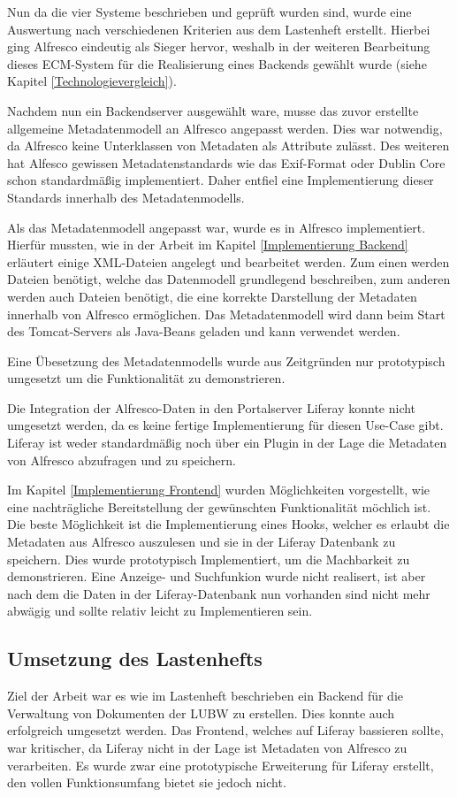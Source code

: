 Nun da die vier Systeme beschrieben und gepr\"uft wurden sind, wurde eine Auswertung nach verschiedenen Kriterien aus dem Lastenheft erstellt. Hierbei ging Alfresco eindeutig als Sieger hervor, weshalb in der weiteren Bearbeitung dieses ECM-System f\"ur die Realisierung eines Backends gew\"ahlt wurde (siehe Kapitel \ref{Technologievergleich}).

Nachdem nun ein Backendserver ausgew\"ahlt ware, musse das zuvor erstellte allgemeine Metadatenmodell an Alfresco angepasst werden. Dies war notwendig, da Alfresco keine Unterklassen von Metadaten als Attribute zul\"asst. Des weiteren hat Alfesco gewissen Metadatenstandards wie das \ac{Exif}-Format oder Dublin Core schon standardm\"a\ss{}ig implementiert. Daher entfiel eine Implementierung dieser Standards innerhalb des Metadatenmodells.

Als das Metadatenmodell angepasst war, wurde es in Alfresco implementiert. Hierf\"ur mussten, wie in der Arbeit im Kapitel \ref{Implementierung Backend} erl\"autert einige XML-Dateien angelegt und bearbeitet werden. Zum einen werden Dateien ben\"otigt, welche das Datenmodell grundlegend beschreiben, zum anderen werden auch Dateien ben\"otigt, die eine korrekte Darstellung der Metadaten innerhalb von Alfresco erm\"oglichen. 
Das Metadatenmodell wird dann beim Start des Tomcat-Servers als Java-Beans geladen und kann verwendet werden.

Eine \"Ubesetzung des Metadatenmodells wurde aus Zeitgr\"unden nur prototypisch umgesetzt um die Funktionalit\"at zu demonstrieren. 

Die Integration der Alfresco-Daten in den Portalserver Liferay konnte nicht umgesetzt werden, da es keine fertige Implementierung f\"ur diesen Use-Case gibt. Liferay ist weder standardm\"a\ss{}ig noch \"uber ein Plugin in der Lage die Metadaten von Alfresco abzufragen und zu speichern.

Im Kapitel \ref{Implementierung Frontend} wurden M\"oglichkeiten vorgestellt, wie eine nachtr\"agliche Bereitstellung der gew\"unschten Funktionalit\"at m\"ochlich ist. Die beste M\"oglichkeit ist die Implementierung eines Hooks, welcher es erlaubt die Metadaten aus Alfresco auszulesen und sie in der Liferay Datenbank zu speichern. Dies wurde prototypisch Implementiert, um die Machbarkeit zu demonstrieren. Eine Anzeige- und Suchfunkion wurde nicht realisert, ist aber nach dem die Daten in der Liferay-Datenbank nun vorhanden sind nicht mehr abw\"agig und sollte relativ leicht zu Implementieren sein.

\subsection{Umsetzung des Lastenhefts}
Ziel der Arbeit war es wie im Lastenheft beschrieben ein Backend f\"ur die Verwaltung von Dokumenten der \ac{LUBW} zu erstellen. Dies konnte auch erfolgreich umgesetzt werden. Das Frontend, welches auf Liferay bassieren sollte, war kritischer, da Liferay nicht in der Lage ist Metadaten von Alfresco zu verarbeiten. Es wurde zwar eine prototypische Erweiterung f\"ur Liferay erstellt, den vollen Funktionsumfang bietet sie jedoch nicht.

